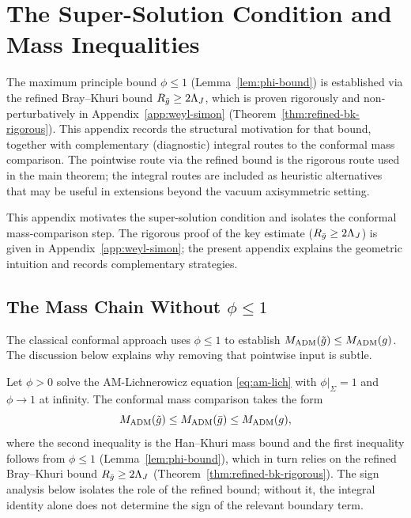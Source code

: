 \section{The Super-Solution Condition and Mass Inequalities}\label{app:supersolution}

\begin{remark}\label{rem:supersolution-clarification}
The maximum principle bound $\phi \leq 1$ (Lemma~\ref{lem:phi-bound}) is established via the refined Bray--Khuri bound $R_{\bar{g}}\geq 2\Lambda_J$, which is proven rigorously and non-perturbatively in Appendix~\ref{app:weyl-simon} (Theorem~\ref{thm:refined-bk-rigorous}). This appendix records the structural motivation for that bound, together with complementary (diagnostic) integral routes to the conformal mass comparison. The pointwise route via the refined bound is the rigorous route used in the main theorem; the integral routes are included as heuristic alternatives that may be useful in extensions beyond the vacuum axisymmetric setting.
\end{remark}

This appendix motivates the super-solution condition and isolates the conformal mass-comparison step. The rigorous proof of the key estimate ($R_{\bar{g}}\geq 2\Lambda_J$) is given in Appendix~\ref{app:weyl-simon}; the present appendix explains the geometric intuition and records complementary strategies.

\subsection{The Mass Chain Without \texorpdfstring{$\phi \leq 1$}{phi <= 1}}

The classical conformal approach uses $\phi \leq 1$ to establish $M_{\mathrm{ADM}}(\tilde{g}) \leq M_{\mathrm{ADM}}(g)$. The discussion below explains why removing that pointwise input is subtle.

\begin{proposition}\label{prop:mass-bound-energy}\label{lem:mass-bound-direct}
Let $\phi > 0$ solve the AM-Lichnerowicz equation \eqref{eq:am-lich} with $\phi|_\Sigma = 1$ and $\phi \to 1$ at infinity. The conformal mass comparison takes the form
\[
M_{\mathrm{ADM}}(\tilde{g}) \leq M_{\mathrm{ADM}}(\bar{g}) \leq M_{\mathrm{ADM}}(g),
\]
where the second inequality is the Han--Khuri mass bound \cite{hankhuri2013} and the first inequality follows from $\phi\leq 1$ (Lemma~\ref{lem:phi-bound}), which in turn relies on the refined Bray--Khuri bound $R_{\bar{g}}\geq 2\Lambda_J$ (Theorem~\ref{thm:refined-bk-rigorous}). The sign analysis below isolates the role of the refined bound; without it, the integral identity alone does not determine the sign of the relevant boundary term.
\end{proposition}

